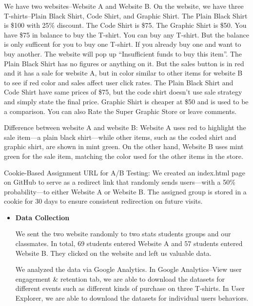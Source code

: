 \documentclass[
  letterpaper,
  DIV=11,
  numbers=noendperiod]{scrartcl}
\begin{document}
\begin{itemize}
  We have two websites--Website A and Website B. On the website, we have
  three T-shirts--Plain Black Shirt, Code Shirt, and Graphic Shirt. The
  Plain Black Shirt is \$100 with 25\% discount. The Code Shirt is \$75.
  The Graphic Shirt is \$50. You have \$75 in balance to buy the
  T-shirt. You can buy any T-shirt. But the balance is only sufficent
  for you to buy one T-shirt. If you already buy one and want to buy
  another. The website will pop up ``Insufficient funds to buy this
  item''. The Plain Black Shirt has no figures or anything on it. But
  the sales button is in red and it has a sale for website A, but in
  color similar to other items for website B to see if red color and
  sales affect user click rates. The Plain Black Shirt and Code Shirt
  have same prices of \$75, but the code shirt doesn't use sale strategy
  and simply state the final price. Graphic Shirt is cheaper at \$50 and
  is used to be a comparison. You can also Rate the Super Graphic Store
  or leave comments.

  Difference between website A and website B: Website A uses red to
  highlight the sale item---a plain black shirt---while other items,
  such as the coded shirt and graphic shirt, are shown in mint green. On
  the other hand, Website B uses mint green for the sale item, matching
  the color used for the other items in the store.
\end{itemize}

Cookie-Based Assignment URL for A/B Testing: We created an index.html
page on GitHub to serve as a redirect link that randomly sends
users---with a 50\% probability---to either Website A or Website B. The
assigned group is stored in a cookie for 30 days to ensure consistent
redirection on future visits.

\begin{itemize}
\item
  \textbf{Data Collection}

  We sent the two website randomly to two stats students groups and our
  classmates. In total, 69 students entered Website A and 57 students
  entered Website B. They clicked on the website and left us valuable
  data.

  We analyzed the data via Google Analytics. In Google Analytics--View
  user engagement \& retention tab, we are able to download the datasets
  for different events such as different kinds of purchase on three
  T-shirts. In User Explorer, we are able to download the datasets for
  individual users behaviors.
\end{itemize}
\end{document}
